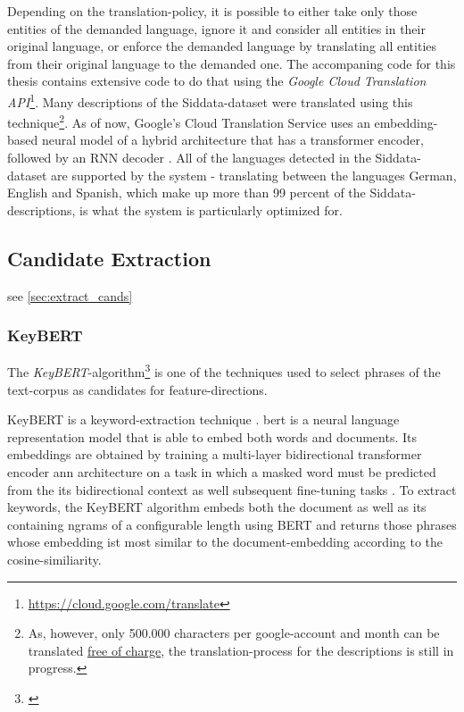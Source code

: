 Depending on the translation-policy, it is possible to either take only those entities of the demanded language, ignore it and consider all entities in their original language, or enforce the demanded language by translating all entities from their original language to the demanded one. The accompaning code for this thesis contains extensive code to do that using the \emph{Google Cloud Translation API}\footnote{\url{https://cloud.google.com/translate}}. Many descriptions of the Siddata-dataset were translated using this technique\footnote{As, however, only 500.000 characters per google-account and month can be translated \href{https://cloud.google.com/translate/pricing}{free of charge}, the translation-process for the descriptions is still in progress.}. As of now, Google's Cloud Translation Service uses an embedding-based neural model of a hybrid architecture that has a transformer encoder, followed by an RNN decoder \cite{Chen2018}. All of the languages detected in the Siddata-dataset are supported by the system - translating between the languages German, English and Spanish, which make up more than 99 percent of the Siddata-descriptions, is what the system is particularly optimized for. 


\subsection*{Candidate Extraction}

see \autoref{sec:extract_cands}

\subsubsection*{KeyBERT}
\label{ap:details_keybert}

The \emph{KeyBERT}-algorithm\footnote{\label{fnote:keybertgibhut}} \cite{grootendorst2020keybert} is one of the techniques used to select phrases of the text-corpus as candidates for feature-directions. 

KeyBERT is a keyword-extraction technique . \Gls{bert} is a neural language representation model that is able to embed both words and documents. Its embeddings are obtained by training a multi-layer bidirectional transformer encoder \gls{ann} architecture on a task in which a masked word must be predicted from the its bidirectional context as well subsequent fine-tuning tasks \cite{Devlin2019}. To extract keywords, the KeyBERT algorithm embeds both the document as well as its containing \glspl{ngram} of a configurable length using BERT and returns those phrases whose embedding ist most similar to the document-embedding according to the cosine-similiarity.

